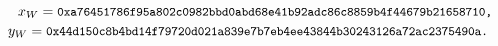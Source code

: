 $$x_W = \text{{\small{\tt 0xa76451786f95a802c0982bbd0abd68e41b92adc86c8859b4f44679b21658710,}}}$$
$$y_W = \text{{\small{\tt 0x44d150c8b4bd14f79720d021a839e7b7eb4ee43844b30243126a72ac2375490a.
}}}$$
